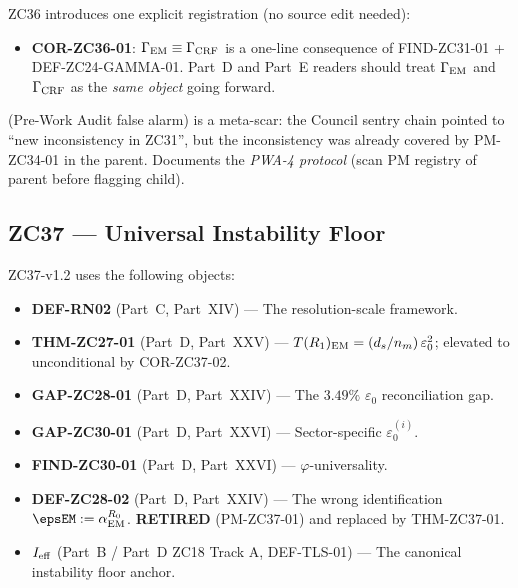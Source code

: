 \documentclass[12pt, a4paper]{article}
\begin{document}
\begin{correctionbox}
ZC36 introduces one explicit registration (no source edit needed):
\begin{itemize}[noitemsep,leftmargin=1.5em]
  \item \textbf{COR-ZC36-01}: $\Gamma_{\rm EM} \equiv \Gamma_{\rm CRF}$
    is a one-line consequence of FIND-ZC31-01 + DEF-ZC24-GAMMA-01.
    Part~D and Part~E readers should treat $\Gamma_{\rm EM}$ and
    $\Gamma_{\rm CRF}$ as the \emph{same object} going forward.
\end{itemize}
\end{correctionbox}

\noindent {} (Pre-Work Audit false alarm) is a meta-scar:
the Council sentry chain pointed to ``new inconsistency in ZC31'',
but the inconsistency was already covered by PM-ZC34-01 in the parent.
Documents the \emph{PWA-4 protocol} (scan PM registry of parent before
flagging child).

\bigskip

\subsection{ZC37 --- Universal Instability Floor}
\label{cmap:zc37}

\begin{inheritbox}
ZC37-v1.2 uses the following objects:
\begin{itemize}[noitemsep,leftmargin=1.5em]
  \item \textbf{DEF-RN02} (Part~C, Part~XIV) --- The resolution-scale
    framework.
  \item \textbf{THM-ZC27-01} (Part~D, Part~XXV) ---
    $T(R_1)_{\rm EM} = (d_s/n_m)\,\varepsilon_0^2$;
    elevated to unconditional by COR-ZC37-02.
  \item \textbf{GAP-ZC28-01} (Part~D, Part~XXIV) ---
    The $3.49\%$ $\varepsilon_0$ reconciliation gap.
  \item \textbf{GAP-ZC30-01} (Part~D, Part~XXVI) ---
    Sector-specific $\varepsilon_0^{(i)}$.
  \item \textbf{FIND-ZC30-01} (Part~D, Part~XXVI) ---
    $\varphi$-universality.
  \item \textbf{DEF-ZC28-02} (Part~D, Part~XXIV) ---
    The wrong identification $\epsEM := \alpha_{\rm EM}^{R_0}$.
    \textbf{RETIRED} (PM-ZC37-01) and replaced by THM-ZC37-01.
  \item \textbf{$I_{\rm eff}$} (Part~B / Part~D ZC18 Track A,
    DEF-TLS-01) --- The canonical instability floor anchor.
\end{itemize}
\end{inheritbox}
\end{document}
